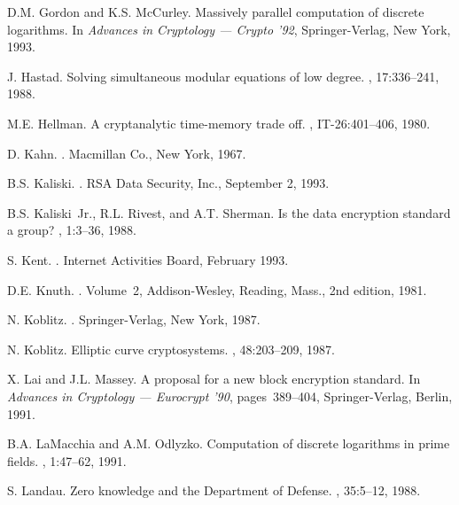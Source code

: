 \begin{thebibliography}{10}
D.M. Gordon and K.S. McCurley.
\newblock Massively parallel computation of discrete logarithms.
\newblock In {\it Advances in Cryptology --- Crypto '92}, Springer-Verlag, New
  York, 1993.

J. Hastad.
\newblock Solving simultaneous modular equations of low degree.
, 17:336--241, 1988.

M.E. Hellman.
\newblock A cryptanalytic time-memory trade off.
, IT-26:401--406, 1980.

D. Kahn.
.
\newblock Macmillan Co., New York, 1967.

B.S. Kaliski.
.
\newblock RSA Data Security, Inc., September 2, 1993.

B.S. Kaliski~Jr., R.L. Rivest, and A.T. Sherman.
\newblock Is the data encryption standard a group?
, 1:3--36, 1988.

S. Kent.
.
\newblock Internet Activities Board, February 1993.

D.E. Knuth.
.
\newblock Volume~2, Addison-Wesley, Reading, Mass., 2nd edition, 1981.

N. Koblitz.
.
\newblock Springer-Verlag, New York, 1987.

N. Koblitz.
\newblock Elliptic curve cryptosystems.
, 48:203--209, 1987.

X. Lai and J.L. Massey.
\newblock A proposal for a new block encryption standard.
\newblock In {\it Advances in Cryptology --- Eurocrypt '90}, pages~389--404,
  Springer-Verlag, Berlin, 1991.

B.A. LaMacchia and A.M. Odlyzko.
\newblock Computation of discrete logarithms in prime fields.
, 1:47--62, 1991.

S. Landau.
\newblock Zero knowledge and the {Department of Defense}.
, 35:5--12, 1988.


\end{thebibliography}
